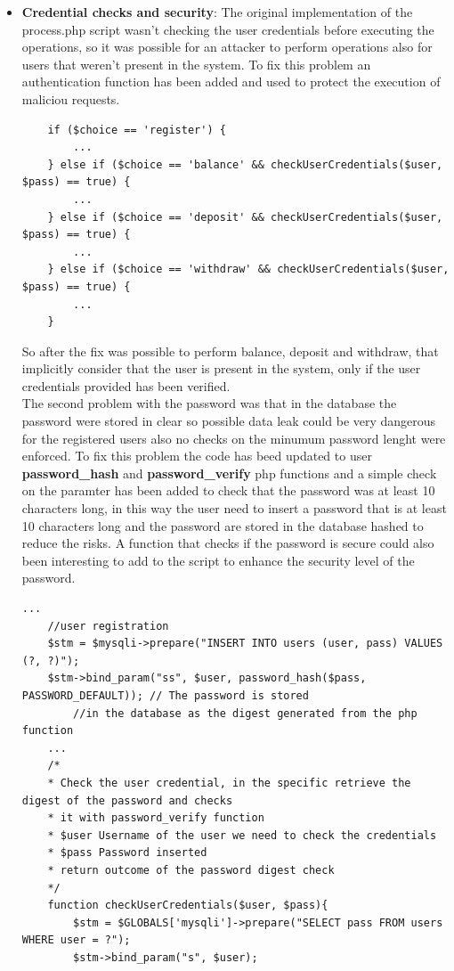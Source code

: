 \documentclass[14pt]{article}
\begin{document}
\begin{itemize}
	\item \textbf{Credential checks and security}: The original implementation of the process.php script wasn't checking the user credentials before executing the operations, so it was possible for an attacker to perform operations also for users that weren't present in the system. To fix this problem an authentication function has been added and used to protect the execution of maliciou requests.
	\begin{Verbatim}
	if ($choice == 'register') {
		...
	} else if ($choice == 'balance' && checkUserCredentials($user, $pass) == true) {
		...
	} else if ($choice == 'deposit' && checkUserCredentials($user, $pass) == true) {
		...
	} else if ($choice == 'withdraw' && checkUserCredentials($user, $pass) == true) {
		... 
	} 
	\end{Verbatim}
	So after the fix was possible to perform balance, deposit and withdraw, that implicitly consider that the user is present in the system, only if the user credentials provided has been verified.
	\\
	The second problem with the password was that in the database the password were stored in clear so possible data leak could be very dangerous for the registered users also no checks on the minumum password lenght were enforced. To fix this problem the code has beed updated to user \textbf{password\_hash} and \textbf{password\_verify} php functions and a simple check on the paramter has been added to check that the password was at least 10 characters long, in this way the user need to insert a password that is at least 10 characters long and the password are stored in the database hashed to reduce the risks. A function that checks if the password is secure could also been interesting to add to the script to enhance the security level of the password. 
	\begin{Verbatim}[tabsize=4]
	...
	//user registration
	$stm = $mysqli->prepare("INSERT INTO users (user, pass) VALUES (?, ?)");
	$stm->bind_param("ss", $user, password_hash($pass, PASSWORD_DEFAULT)); // The password is stored 
		//in the database as the digest generated from the php function
	...
	/*
	* Check the user credential, in the specific retrieve the digest of the password and checks
	* it with password_verify function
	* $user Username of the user we need to check the credentials
	* $pass Password inserted
	* return outcome of the password digest check
	*/
	function checkUserCredentials($user, $pass){
		$stm = $GLOBALS['mysqli']->prepare("SELECT pass FROM users WHERE user = ?");
		$stm->bind_param("s", $user);
		

\end{Verbatim}
\end{itemize}
\end{document}

